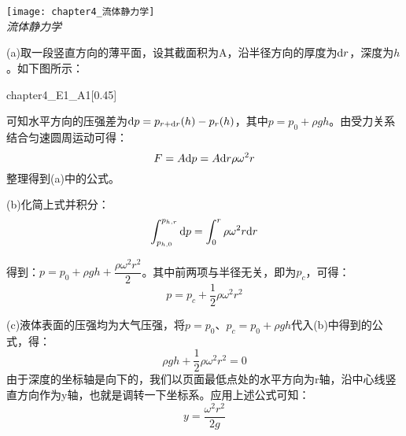 \chapter[流体力学]{}
\begin{solution}[\\A fluid is rotating at constant angular velocity $\omega$ about the central vertical axis of a cylindrical container.\\
    (a)Show that the \itr{variation}{变化} of pressure in the \itr{radial direction}{径向} is given by $\dfrac{\dif p}{\dif r}=\rho \omega^2 r$.\\
    (b)Take $p=p_c$ at the axis of rotation (r=0) and show that the pressure $p$ at any point $r$ is
    \[
        p=p_c+\dfrac{1}{2}\rho\omega^2 r^2
    \]
    (c)Show that the liquid surface is of \itr{paraboloidal}{抛物面的} form; that is, a vertical cross section of the surface is the curve $y=\dfrac{\omega^2 r^2}{2g}$]
    \begin{center}
    	\texttt{[image: chapter4\_流体静力学]}\\
    	\itshape 流体静力学
    \end{center}
    (a)取一段竖直方向的薄平面，设其截面积为A，沿半径方向的厚度为$\mathrm{d} r$，深度为$h$。如下图所示：
    \begin{singlefigure}[A-4-1]{chapter4_E1_A1}[0.45]
    \end{singlefigure}

    可知水平方向的压强差为$\mathrm{d} p=p_{r+\mathrm{d} r}(h)-p_r(h)$，其中$p=p_0+\rho gh$。由受力关系结合匀速圆周运动可得：
        \[F=A\mathrm{d} p=A\mathrm{d} r \rho \omega^2 r\]
    整理得到(a)中的公式。
    
    (b)化简上式并积分：
        \[\int_{p_{h,0}}^{p_{h,r}}\mathrm{d} p=\int_{0}^{r}\rho \omega^2 r\mathrm{d} r\]

    得到：$p=p_0+\rho gh+\dfrac{\rho \omega^2 r^2}{2}$。其中前两项与半径无关，即为$p_c$，可得：
        \[p=p_c+\dfrac{1}{2}\rho \omega^2 r^2\]
        
    (c)液体表面的压强均为大气压强，将$p=p_0$、$p_c=p_0+\rho gh$代入(b)中得到的公式，得：
        \[\rho gh+\dfrac{1}{2}\rho \omega^2 r^2=0\]
    由于深度的坐标轴是向下的，我们以页面最低点处的水平方向为r轴，沿中心线竖直方向作为y轴，也就是调转一下坐标系。应用上述公式可知：
        \[y=\dfrac{\omega^2 r^2}{2g}\]
\end{solution}
\newpage
